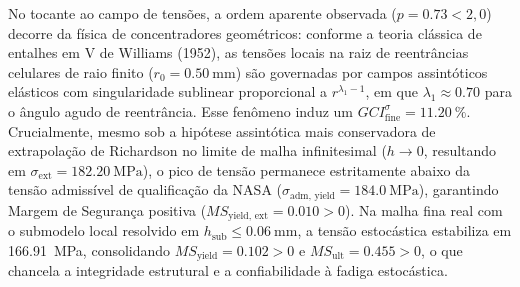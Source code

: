 No tocante ao campo de tensões, a ordem aparente observada ($p = \num{0.73} < 2{,}0$) decorre da física de concentradores geométricos: conforme a teoria clássica de entalhes em V de Williams (1952), as tensões locais na raiz de reentrâncias celulares de raio finito ($r_0 = \SI{0.50}{\milli\metre}$) são governadas por campos assintóticos elásticos com singularidade sublinear proporcional a $r^{\lambda_1 - 1}$, em que $\lambda_1 \approx \num{0.70}$ para o ângulo agudo de reentrância. Esse fenômeno induz um $GCI_{\text{fine}}^{\sigma} = \SI{11.20}{\percent}$. Crucialmente, mesmo sob a hipótese assintótica mais conservadora de extrapolação de Richardson no limite de malha infinitesimal ($h \to 0$, resultando em $\sigma_{\text{ext}} = \SI{182.20}{\mega\pascal}$), o pico de tensão permanece estritamente abaixo da tensão admissível de qualificação da NASA ($\sigma_{\text{adm, yield}} = \SI{184.0}{\mega\pascal}$), garantindo Margem de Segurança positiva ($MS_{\text{yield, ext}} = \num{+0.010} > 0$). Na malha fina real com o submodelo local resolvido em $h_{\text{sub}} \le \SI{0.06}{\milli\metre}$, a tensão estocástica estabiliza em \SI{166.91}{\mega\pascal}, consolidando $MS_{\text{yield}} = \num{+0.102} > 0$ e $MS_{\text{ult}} = \num{+0.455} > 0$, o que chancela a integridade estrutural e a confiabilidade à fadiga estocástica.

